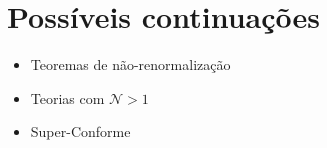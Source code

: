 \documentclass{beamer}
\begin{document}
\section{Possíveis continuações}
\begin{frame}
    \begin{itemize}
        \item Teoremas de não-renormalização
        \item Teorias com $\mathcal N>1$
        \item Super-Conforme
    \end{itemize}
\end{frame}

\begin{frame}\addtocounter{framenumber}{-1}
\end{frame}

\addtocounter{framenumber}{2000}
\end{document}

